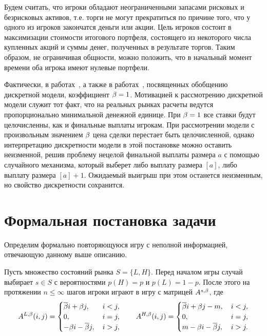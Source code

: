 

Будем считать, что игроки обладают неограниченными запасами рисковых и
безрисковых активов, т.е. торги не могут прекратиться по причине того, что у
одного из игроков закончатся деньги или акции. Цель игроков состоит в
максимизации стоимости итогового портфеля, состоящего из некоторого числа
купленных акций и суммы денег, полученных в результате торгов. Таким образом, не
ограничивая общности, можно положить, что в начальный момент времени оба игрока
имеют нулевые портфели.

Фактически, в работах~\cite{domansky07, demeyer05}, а также в
работах~\cite{domansky11, domansky13, domansky14}, посвященных обобщению
дискретной модели, коэффициент $\beta = 1$. Мотивацией к рассмотрению дискретной
модели служит тот факт, что на реальных рынках расчеты ведутся пропорционально
минимальной денежной единице. При $\beta = 1$ все ставки будут целочисленны, как и
финальные выплаты игрокам. При рассмотрении модели с произвольным значением
$\beta$ цена сделки перестает быть целочисленной, однако интерпретацию
дискретности модели в этой постановке можно оставить неизменной, решив проблему
нецелой финальной выплаты размера $a$ с помощью случайного механизма, который
выберет либо выплату размера $[a]$, либо выплату размера $[a] + 1$. Ожидаемый
выигрыш при этом останется неизменным, но свойство дискретности сохранится.

\section{Формальная постановка задачи}

Определим формально повторяющуюся игру с неполной информацией, отвечающую
данному выше описанию. 

Пусть множество состояний рынка $S = \{L, H\}$. Перед началом игры случай
выбирает $s \in S $ с вероятностями $p(H) = p$ и $p(L) = 1 - p$. После этого на
протяжении $n \leq \infty$ шагов игроки играют в игру с матрицей $A^{s,\beta}$,
где
\begin{equation*}
  A^{L,\beta}(i, j) = \begin{cases}
    \overline{\beta} i + \beta j, &\, i < j, \\
    0, &\, i = j, \\
    -\beta i - \overline{\beta} j, &\, i > j,
  \end{cases}
  \qquad
  A^{H,\beta}(i, j) = \begin{cases}
    \overline{\beta} i + \beta j - m, &\, i < j, \\
    0, &\, i = j, \\
    m - \beta i - \overline{\beta} j, &\, i > j.
  \end{cases}
\end{equation*}


